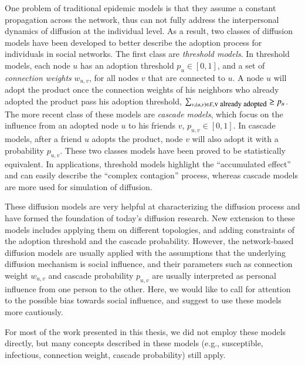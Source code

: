 \documentclass[phd,tocprelim]{cornell}
\begin{document}
One problem of traditional epidemic models is that they assume a constant propagation across the network, thus can not fully address the interpersonal dynamics of diffusion at the individual level. As a result, two classes of diffusion models have been developed to better describe the adoption process for individuals in social networks. The first class are \emph{threshold models}\cite{Granovetter:1978}. In threshold models, each node $u$ has an adoption threshold $p_u \in [0,1]$, and a set of \emph{connection weights} $w_{u,v}$, for all nodes $v$ that are connected to $u$. A node $u$ will adopt the product once the connection weights of his neighbors who already adopted the product pass his adoption threshold, $\sum_{v, (u,v)\in E,  \textnormal{\small v already adopted}} \ge p_u$. The more recent class of these models are \emph{cascade models}, which focus on the influence from an adopted node $u$ to his friends $v$, $p_{u,v} \in [0,1]$. In cascade models, after a friend $u$ adopts the product, node $v$ will also adopt it with a probability $p_{u,v}$. These two classes models have been proved to be statistically equivalent\cite{Goldenberg:2001,Kempe-2003}. In applications, threshold models highlight the ``accumulated effect'' and can easily describe the ``complex contagion'' process\cite{Centola:2007}, whereas cascade models are more used for simulation of diffusion\cite{Goldenberg:2001}.

These diffusion models are very helpful at characterizing the diffusion process and have formed the foundation of today's diffusion research. New extension to these models includes applying them on different topologies\cite{pastor-satorras01,Eguiluz-2002,Dodds:2005}, and adding constraints of the adoption threshold and the cascade probability\cite{wu-2004}. However, the network-based diffusion models are usually applied with the assumptions that the underlying diffusion mechanism is social influence, and their parameters such as connection weight $w_{u,v}$ and cascade probability $p_{u,v}$ are usually interpreted as personal influence from one person to the other. Here, we would like to call for attention to the possible bias towards social influence, and suggest to use these models more cautiously.

For most of the work presented in this thesis, we did not employ these models directly, but many concepts described in these models (e.g., susceptible, infectious, connection weight, cascade probability) still apply.


\end{document}
